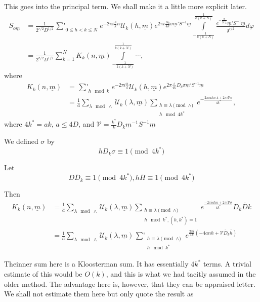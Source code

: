 This goes into the principal term. We shall make it a little more
explicit later. 
\begin{align*}
S_{o \underline{m}} & = \frac{1}{2^{r/2} D^{1/2}}
  \mathop{\textstyle{\sum'}}_{0 \leq h < k\leq N} e^{- 2 \pi i
    \frac{h}{k} n} \mathscr{U}_k (h, \underline{m}) e^{2 \pi i
    \frac{D_k}{4k} \sigma \underline{m}' S^{-1} \underline{m}}
  \int\limits^{\frac{1}{k(k+N)}}_{- \frac{1}{k(k+N)}}
  \frac{e^{-\frac{\pi}{2k^2 \mathfrak{z}}} \underline{m}' S^{-1}
    \underline{m}}{\mathfrak{z}^{r/2}} d \varphi\\
  & = \frac{1}{2^{r/2} D^{1/2}} \sum^N_{k=1} K_k (n, \underline{m})
  \int\limits^{\frac{1}{k(k+N)}}_{- \frac{1}{k(k+N)}} \cdots, 
\end{align*}
where\pageoriginale
\begin{align*}
  K_k (n, \underline{m}) & = \mathop{\textstyle{\sum'}}_{h \mod k} e^{- 2
  \pi i \frac{h}{k}} \mathscr{U}_k (h, \underline{m}) e^{2 \pi
    \frac{i}{4k}D_k \sigma \underline{m}' S^{-1} \underline{m}}\\
  & = \frac{1}{a} \sum_{\lambda \mod \wedge} \mathscr{U}_k (\lambda,
  \underline{m}) \sum_{\substack{h \equiv \lambda \pmod{\wedge}\\ h
      \mod 4k^*}} e^{-\frac{2 \pi i a h n .4 + 2 \pi i \mathscr{V} \sigma}{4k^*}},
\end{align*}
where $4k^*=ak$, $a \leq 4D$, and $\mathscr{V}= \frac{k^*}{k} D_k
\underline{m}^{-1} S^{-1} \underline{m}$

We defined $\sigma$ by
$$
h D_k \sigma \equiv 1 \pmod{4k^*}
$$ 

Let 
$$
D \bar{D}_k \equiv 1 \pmod{4k^*}, h \bar{H} \equiv 1 \pmod{4k^*}
$$

Then 
\begin{align*}
  K_k (n, \underline{m}) & = \frac{1}{a} \sum_{\lambda \mod \wedge}
  \mathscr{U}_k (\lambda, \underline{m}) \sum_{\substack{h \equiv
      \lambda \pmod{\wedge}\\h \mod k^*, (h, k^*) =1}} e^{\frac{- 2
      \pi i a hn + 2 \pi i \mathscr{V} \sigma}{4k^*}} D_k \bar{D}k\\
  & = \frac{1}{a} \sum_{\lambda \mod \wedge} \mathscr{U}_k (\lambda,
  \underline{m}) \mathop{\textstyle{\sum'}}_{\substack{h \equiv
      \lambda \pmod{\wedge}\\h \mod k^*}} e^{\frac{2 \pi
      i}{4k}\left(-4a nh + \mathscr{V} \bar{D}_k \bar{h} \right)}
\end{align*}

The\pageoriginale inner sum here is a Kloosterman sum. It has
essentially $4k^*$ terms. A trivial estimate of this would be
$O(k)$, and this is what we had tacitly assumed in the older
method. The advantage here is, however, that they can be appraised
letter. We shall not estimate them here but only quote the result as

